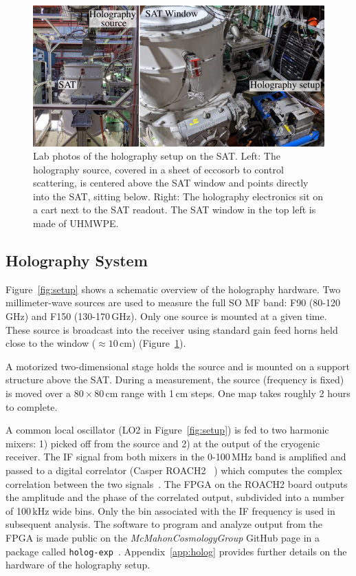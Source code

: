 \begin{figure}[t!]
    \centering
    \includegraphics[width = \textwidth]{Figures/sat_exp.pdf}
    \caption{Lab photos of the holography setup on the SAT.  Left: The holography source, covered in a sheet of eccosorb to control scattering, is centered above the SAT window and points directly into the SAT, sitting below.  Right: The holography electronics sit on a cart next to the SAT readout.  The SAT window in the top left is made of UHMWPE.}
    \label{fig:sat_hardware}
\end{figure}

\subsection{Holography System}
\label{sec:sat_meas_hardware}

Figure~\ref{fig:setup} shows a schematic overview of the holography hardware.  Two millimeter-wave sources are used to measure the full SO MF band: F90 (80-120\,GHz) and F150 (130-170\,GHz).  Only one source is mounted at a given time.  These source is broadcast into the receiver using standard gain feed horns held close to the window ($\approx10$\,cm) (Figure~\ref{fig:sat_hardware}).

A motorized two-dimensional stage holds the source and is mounted on a support structure above the SAT.  During a measurement, the source (frequency is fixed) is moved over a $80\times80$\,cm range with 1\,cm steps.  One map takes roughly 2 hours to complete.

A common local oscillator (LO2 in Figure~\ref{fig:setup}) is fed to two harmonic mixers: 1) picked off from the source and 2) at the output of the cryogenic receiver.  The IF signal from both mixers in the 0-100\,MHz band is amplified and passed to a digital correlator (Casper ROACH2 ~\cite{roach2}) which computes the complex correlation between the two signals~\cite{ches18}.  The FPGA on the ROACH2 board outputs the amplitude and the phase of the correlated output, subdivided into a number of 100\,kHz wide bins.  Only the bin associated with the IF frequency is used in subsequent analysis.  The software to program and analyze output from the FPGA is made public on the \textit{McMahonCosmologyGroup} GitHub page in a package called \verb|holog-exp|~\cite{holog-exp}.  Appendix~\ref{app:holog} provides further details on the hardware of the holography setup.

